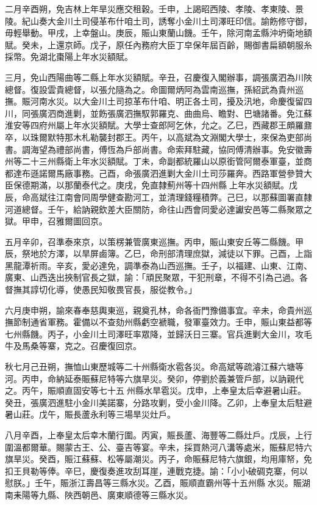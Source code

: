 \begin{pinyinscope}
二月辛酉朔，免吉林上年旱災應交租穀。壬申，上謁昭西陵、孝陵、孝東陵、景陵。紀山奏大金川土司侵革布什咱土司，誘奪小金川土司澤旺印信。諭飭修守御，毋輕舉動。甲戌，上幸盤山。庚辰，賑山東蘭山饑。壬午，除河南孟縣沖坍衛地額賦。癸未，上還京師。戊子，原任內務府大臣丁皁保年屆百齡，賜御書扁額朝服糸採幣。免湖北棗陽上年水災額賦。

三月，免山西陽曲等二縣上年水災額賦。辛丑，召慶復入閣辦事，調張廣泗為川陜總督。復設雲貴總督，以張允隨為之。命圖爾炳阿為雲南巡撫，孫紹武為貴州巡撫。賑河南水災。以大金川土司掠革布什咱、明正各土司，擾及汛地，命慶復留四川，同張廣泗商進剿，並飭張廣泗撫馭郭羅克、曲曲烏、瞻對、巴塘諸番。免江蘇淮安等四府州屬上年水災額賦。大學士查郎阿乞休，允之。乙巳，西藏郡王頗羅鼐卒，以珠爾默特那木札勒襲封郡王。丙午，以高斌為文淵閣大學士，來保為吏部尚書。調海望為禮部尚書，傅恆為戶部尚書。命索拜駐藏，協同傅清辦事。免安徽壽州等二十三州縣衛上年水災額賦。丁未，命副都統羅山以原銜管阿爾泰軍臺，並商都達布遜諾爾馬廠事務。己酉，命張廣泗進剿大金川土司莎羅奔。西路軍營參贊大臣保德期滿，以那蘭泰代之。庚戌，免直隸薊州等十四州縣上年水災額賦。戊辰，命高斌往江南會同周學健查勘河工，並清理錢糧積弊。己巳，以那蘇圖署直隸河道總督。壬午，給訥親欽差大臣關防，命往山西會同愛必達讞安邑等二縣聚眾之獄。甲申，召雅爾圖回京。

五月辛卯，召準泰來京，以策楞兼管廣東巡撫。丙申，賑山東安丘等二縣饑。甲辰，祭地於方澤，以旱屏鹵簿。乙巳，命刑部清理庶獄，減徒以下罪。己酉，上詣黑龍潭祈雨。辛亥，愛必達免，調準泰為山西巡撫。壬子，以福建、山東、江南、廣東、山西迭出挾制官長之獄，諭：「頑民聚眾，干犯刑章，不得不引為己過。各督撫其諄切化導，使愚民知敬畏官長，服從教令。」

六月庚申朔，諭來春奉慈輿東巡，親奠孔林，命各衙門豫備事宜。辛未，命貴州巡撫節制通省軍務。霍備以不查劾州縣虧空褫職，發軍臺效力。壬申，賑山東益都等七州縣饑。丙子，小金川土司澤旺率眾降，並歸沃日三寨。官兵進剿大金川，攻毛牛及馬桑等寨，克之。召慶復回京。

秋七月己丑朔，撫恤山東歷城等二十州縣衛水雹各災。命高斌等疏濬江蘇六塘等河。丙申，命納延泰賑蘇尼特等六旗旱災。癸卯，停劉於義兼管戶部，以訥親代之。丙午，賑順直固安等七十五州縣水旱雹災。戊申，上奉皇太后幸避暑山莊。癸丑，張廣泗進駐小金川美諾寨，分路攻剿，受小金川降。乙卯，上奉皇太后駐避暑山莊。戊午，賑長蘆永利等三場旱災灶戶。

八月辛酉，上奉皇太后幸木蘭行圍。丙寅，賑長蘆、海豐等二縣灶戶。戊辰，上行圍溫都爾華。賜蒙古王、公、臺吉等宴。辛未，採買熱河八溝等處米，賑蘇尼特六旗旱災。癸酉，賑江蘇蘇、松等屬潮災。丙子，命賑蘇尼特六旗銀，均用庫帑，免扣王貝勒等俸。辛巳，慶復奏進攻刮耳崖，連戰克捷。諭：「小小破碉克寨，何以慰朕。」壬午，賑浙江壽昌等三縣水災。乙酉，賑順直霸州等十五州縣水災。賑湖南耒陽等九縣、陜西朝邑、廣東順德等三縣水災。


\end{pinyinscope}
